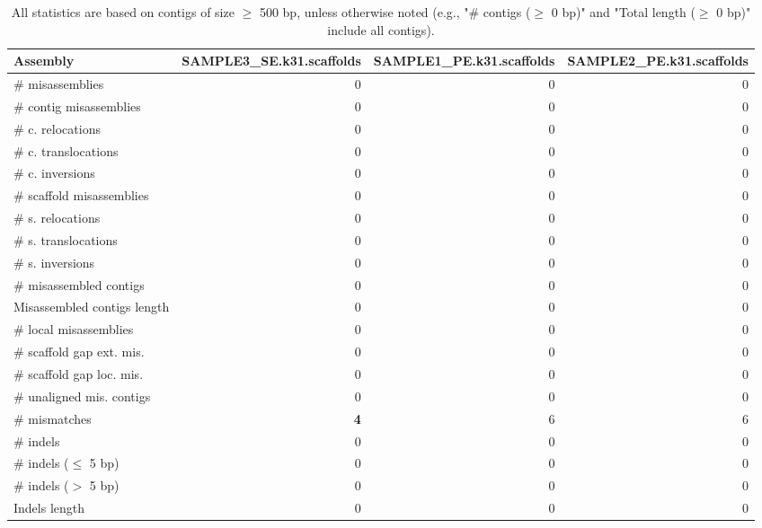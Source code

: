 \documentclass[12pt,a4paper]{article}
\begin{document}
\begin{table}[ht]
\begin{center}
\caption{All statistics are based on contigs of size $\geq$ 500 bp, unless otherwise noted (e.g., "\# contigs ($\geq$ 0 bp)" and "Total length ($\geq$ 0 bp)" include all contigs).}
\begin{tabular}{|l*{3}{|r}|}
\hline
Assembly & SAMPLE3\_SE.k31.scaffolds & SAMPLE1\_PE.k31.scaffolds & SAMPLE2\_PE.k31.scaffolds \\ \hline
\# misassemblies & 0 & 0 & 0 \\ \hline
\hspace{2mm}\# contig misassemblies & 0 & 0 & 0 \\ \hline
\hspace{5mm}\# c. relocations & 0 & 0 & 0 \\ \hline
\hspace{5mm}\# c. translocations & 0 & 0 & 0 \\ \hline
\hspace{5mm}\# c. inversions & 0 & 0 & 0 \\ \hline
\hspace{2mm}\# scaffold misassemblies & 0 & 0 & 0 \\ \hline
\hspace{5mm}\# s. relocations & 0 & 0 & 0 \\ \hline
\hspace{5mm}\# s. translocations & 0 & 0 & 0 \\ \hline
\hspace{5mm}\# s. inversions & 0 & 0 & 0 \\ \hline
\# misassembled contigs & 0 & 0 & 0 \\ \hline
Misassembled contigs length & 0 & 0 & 0 \\ \hline
\# local misassemblies & 0 & 0 & 0 \\ \hline
\# scaffold gap ext. mis. & 0 & 0 & 0 \\ \hline
\# scaffold gap loc. mis. & 0 & 0 & 0 \\ \hline
\# unaligned mis. contigs & 0 & 0 & 0 \\ \hline
\# mismatches & {\bf 4} & 6 & 6 \\ \hline
\# indels & 0 & 0 & 0 \\ \hline
\hspace{5mm}\# indels ($\leq$ 5 bp) & 0 & 0 & 0 \\ \hline
\hspace{5mm}\# indels ($>$ 5 bp) & 0 & 0 & 0 \\ \hline
Indels length & 0 & 0 & 0 \\ \hline
\end{tabular}
\end{center}
\end{table}
\end{document}
